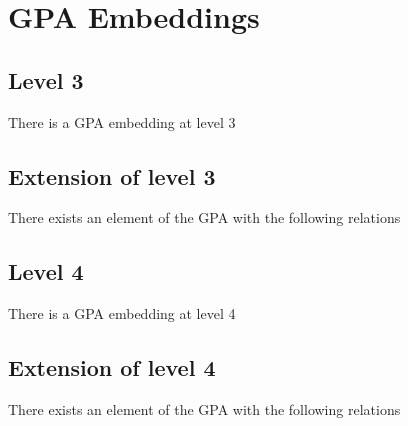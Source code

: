 \section{GPA Embeddings}


\subsection{Level 3}
\begin{theorem}
    There is a GPA embedding at level 3
\end{theorem}

\subsection{Extension of level 3}
\begin{theorem}
    There exists an element of the GPA with the following relations
\end{theorem}



\subsection{Level 4}
\begin{theorem}
    There is a GPA embedding at level 4
\end{theorem}

\subsection{Extension of level 4}
\begin{theorem}
    There exists an element of the GPA with the following relations
\end{theorem}